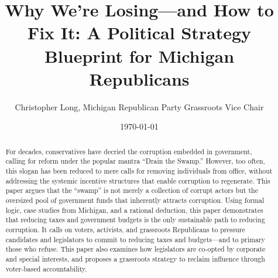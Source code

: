 \documentclass[12pt]{article}
\title{Why We’re Losing—and How to Fix It: A Political Strategy Blueprint for Michigan Republicans}
\author{Christopher Long, Michigan Republican Party Grassroots Vice Chair}
\date{\today}
\begin{document}
\setcounter{secnumdepth}{0}
\maketitle


\begin{abstract}
For decades, conservatives have decried the corruption embedded in government, calling for reform under the popular mantra ``Drain the Swamp.'' However, too often, this slogan has been reduced to mere calls for removing individuals from office, without addressing the systemic incentive structures that enable corruption to regenerate. This paper argues that the ``swamp'' is not merely a collection of corrupt actors but the oversized pool of government funds that inherently attracts corruption. Using formal logic, case studies from Michigan, and a rational deduction, this paper demonstrates that reducing taxes and government budgets is the only sustainable path to reducing corruption. It calls on voters, activists, and grassroots Republicans to pressure candidates and legislators to commit to reducing taxes and budgets—and to primary those who refuse. This paper also examines how legislators are co-opted by corporate and special interests, and proposes a grassroots strategy to reclaim influence through voter-based accountability.
\end{abstract}


\clearpage 

\clearpage  


\clearpage  

\clearpage 

\end{document}
